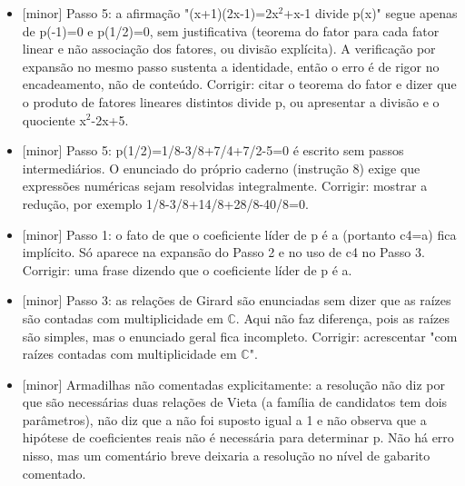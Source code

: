 \documentclass{article}%
\begin{document}
\begin{itemize}%
\item%
{[}minor{]} Passo 5: a afirmação "(x+1)(2x-1)=2x$^2$+x-1 divide p(x)" segue apenas de p(-1)=0 e p(1/2)=0, sem justificativa (teorema do fator para cada fator linear e não associação dos fatores, ou divisão explícita). A verificação por expansão no mesmo passo sustenta a identidade, então o erro é de rigor no encadeamento, não de conteúdo. Corrigir: citar o teorema do fator e dizer que o produto de fatores lineares distintos divide p, ou apresentar a divisão e o quociente x$^2$-2x+5.%
\item%
{[}minor{]} Passo 5: p(1/2)=1/8-3/8+7/4+7/2-5=0 é escrito sem passos intermediários. O enunciado do próprio caderno (instrução 8) exige que expressões numéricas sejam resolvidas integralmente. Corrigir: mostrar a redução, por exemplo 1/8-3/8+14/8+28/8-40/8=0.%
\item%
{[}minor{]} Passo 1: o fato de que o coeficiente líder de p é a (portanto c4=a) fica implícito. Só aparece na expansão do Passo 2 e no uso de c4 no Passo 3. Corrigir: uma frase dizendo que o coeficiente líder de p é a.%
\item%
{[}minor{]} Passo 3: as relações de Girard são enunciadas sem dizer que as raízes são contadas com multiplicidade em $\mathbb{C}$. Aqui não faz diferença, pois as raízes são simples, mas o enunciado geral fica incompleto. Corrigir: acrescentar "com raízes contadas com multiplicidade em $\mathbb{C}$".%
\item%
{[}minor{]} Armadilhas não comentadas explicitamente: a resolução não diz por que são necessárias duas relações de Vieta (a família de candidatos tem dois parâmetros), não diz que a não foi suposto igual a 1 e não observa que a hipótese de coeficientes reais não é necessária para determinar p. Não há erro nisso, mas um comentário breve deixaria a resolução no nível de gabarito comentado.%
\end{itemize}%
\end{document}
